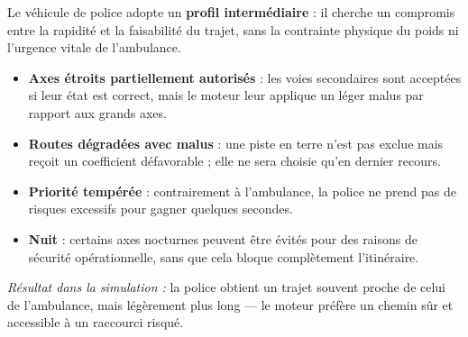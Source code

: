 \documentclass[12pt,a4paper]{article}
\begin{document}
\begin{tcolorbox}[colback=bleupolicier, colframe=theorie, fonttitle=\bfseries\large,
  title={[Police] Police — Équilibre rapidité / accessibilité},
  breakable, sharp corners=south]

Le véhicule de police adopte un \textbf{profil intermédiaire} : il cherche un
compromis entre la rapidité et la faisabilité du trajet, sans la contrainte
physique du poids ni l'urgence vitale de l'ambulance.

\begin{itemize}[leftmargin=1.5em, itemsep=3pt]
  \item \textbf{Axes étroits partiellement autorisés} : les voies secondaires sont
        acceptées si leur état est correct, mais le moteur leur applique un léger
        malus par rapport aux grands axes.
  \item \textbf{Routes dégradées avec malus} : une piste en terre n'est pas exclue
        mais reçoit un coefficient défavorable ; elle ne sera choisie qu'en
        dernier recours.
  \item \textbf{Priorité tempérée} : contrairement à l'ambulance, la police ne
        prend pas de risques excessifs pour gagner quelques secondes.
  \item \textbf{Nuit} : certains axes nocturnes peuvent être évités pour des
        raisons de sécurité opérationnelle, sans que cela bloque complètement
        l'itinéraire.
\end{itemize}

\smallskip
\textit{Résultat dans la simulation :} la police obtient un trajet souvent proche
de celui de l'ambulance, mais légèrement plus long — le moteur préfère un chemin
sûr et accessible à un raccourci risqué.

\end{tcolorbox}

\bigskip
\end{document}
